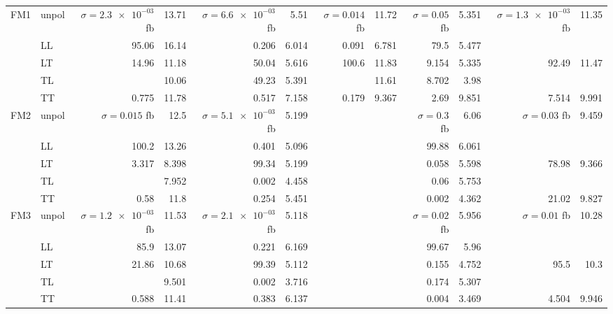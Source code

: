 \begin{table}[h]
{\begin{tabular}{llrrrrrrrrrr}
\midrule
\multirow{5}{*}{FM1}
 & unpol & $\sigma = \num{2.3e-03}$ fb & \num{13.71} & $\sigma = \num{6.6e-03}$ fb & \num{5.51} & $\sigma = \num{0.014}$ fb & \num{11.72} & $\sigma = \num{0.05}$ fb & \num{5.351} & $\sigma = \num{1.3e-03}$ fb & \num{11.35} \\
 & LL & \num{95.06} & \num{16.14} & \num{0.206} & \num{6.014} & \num{0.091} & \num{6.781} & \num{79.5} & \num{5.477} &  &  \\
 & LT & \num{14.96} & \num{11.18} & \num{50.04} & \num{5.616} & \num{100.6} & \num{11.83} & \num{9.154} & \num{5.335} & \num{92.49} & \num{11.47} \\
 & TL &  & \num{10.06} & \num{49.23} & \num{5.391} &  & \num{11.61} & \num{8.702} & \num{3.98} &  &  \\
 & TT & \num{0.775} & \num{11.78} & \num{0.517} & \num{7.158} & \num{0.179} & \num{9.367} & \num{2.69} & \num{9.851} & \num{7.514} & \num{9.991} \\
\midrule
\multirow{5}{*}{FM2}
 & unpol & $\sigma = \num{0.015}$ fb & \num{12.5} & $\sigma = \num{5.1e-03}$ fb & \num{5.199} &  &  & $\sigma = \num{0.3}$ fb & \num{6.06} & $\sigma = \num{0.03}$ fb & \num{9.459} \\
 & LL & \num{100.2} & \num{13.26} & \num{0.401} & \num{5.096} &  &  & \num{99.88} & \num{6.061} &  &  \\
 & LT & \num{3.317} & \num{8.398} & \num{99.34} & \num{5.199} &  &  & \num{0.058} & \num{5.598} & \num{78.98} & \num{9.366} \\
 & TL &  & \num{7.952} & \num{0.002} & \num{4.458} &  &  & \num{0.06} & \num{5.753} &  &  \\
 & TT & \num{0.58} & \num{11.8} & \num{0.254} & \num{5.451} &  &  & \num{0.002} & \num{4.362} & \num{21.02} & \num{9.827} \\
\midrule
\multirow{5}{*}{FM3}
 & unpol & $\sigma = \num{1.2e-03}$ fb & \num{11.53} & $\sigma = \num{2.1e-03}$ fb & \num{5.118} &  &  & $\sigma = \num{0.02}$ fb & \num{5.956} & $\sigma = \num{0.01}$ fb & \num{10.28} \\
 & LL & \num{85.9} & \num{13.07} & \num{0.221} & \num{6.169} &  &  & \num{99.67} & \num{5.96} &  &  \\
 & LT & \num{21.86} & \num{10.68} & \num{99.39} & \num{5.112} &  &  & \num{0.155} & \num{4.752} & \num{95.5} & \num{10.3} \\
 & TL &  & \num{9.501} & \num{0.002} & \num{3.716} &  &  & \num{0.174} & \num{5.307} &  &  \\
 & TT & \num{0.588} & \num{11.41} & \num{0.383} & \num{6.137} &  &  & \num{0.004} & \num{3.469} & \num{4.504} & \num{9.946} \\

\end{tabular}}
\end{table}

